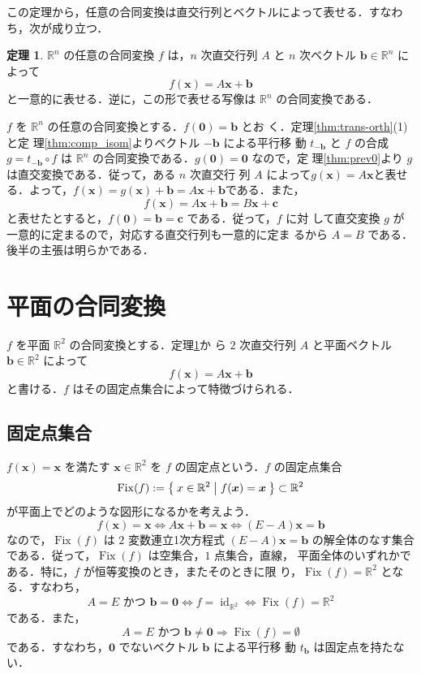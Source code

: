 \documentclass[11pt, uplatex, dvipdfmx, titlepage]{jsarticle}
\makeatletter
\DeclareMathOperator{\Fix}{Fix}
\DeclareMathOperator{\id}{id}
\renewenvironment{proof}[1][\proofname]{\par
  \pushQED{\qed}%
  \normalfont \topsep6\p@\@plus6\p@\relax
  \trivlist
  \item[\hskip\labelsep
         \bfseries
    {#1}]\ignorespaces
}{%
  \popQED\endtrivlist\@endpefalse
}
\theoremstyle{definition}
\newtheorem{theorem}{定理}[section]
\renewcommand{\proofname}{\textbf{証明}}
\makeatother
\begin{document}
この定理から，任意の合同変換は直交行列とベクトルによって表せる．すなわち，次が成り立つ．

\begin{theorem}\label{thm:affine_rep}
  $\mathbb{R}^n$ の任意の合同変換 $f$ は，$n$ 次直交行列 $A$
  と $n$ 次ベクトル $\bm{b} \in \mathbb{R}^n$ によって
  \[
    f(\bm{x}) = A\bm{x} + \bm{b}
  \]
  と一意的に表せる．逆に，この形で表せる写像は $\mathbb{R}^n$ の合同変換である．
\end{theorem}


\begin{proof}
  $f$ を $\mathbb{R}^n$ の任意の合同変換とする．$f(\bm{0})=\bm{b}$ とお
  く．定理\ref{thm:trans-orth}(1)と定
  理\ref{thm:comp_isom}よりベクトル $-\bm{b}$ による平行移
  動 $t_{-\bm{b}}$ と $f$ の合成 $g = t_{-\bm{b}} \circ
  f$ は $\mathbb{R}^n$ の合同変換である．$g(\bm{0})=\bm{0}$ なので，定
  理\ref{thm:prev0}より $g$は直交変換である．従って，ある $n$ 次直交行
  列 $A$
  によって$g(\bm{x})=A\bm{x}$と表せる．よって，$f(\bm{x}) =
  g(\bm{x})+\bm{b} = A\bm{x} + \bm{b}$である．また，
  \[
    f(\bm{x}) = A\bm{x}+\bm{b} = B\bm{x} + \bm{c}
  \]
  と表せたとすると，$f(\bm{0})=\bm{b}=\bm{c}$ である．従って，$f$ に対
  して直交変換 $g$ が一意的に定まるので，対応する直交行列も一意的に定ま
  るから $A=B$ である．後半の主張は明らかである．
\end{proof}


\section{平面の合同変換}\label{sec:2dim}


$f$ を平面 $\mathbb{R}^2$ の合同変換とする．定理\ref{thm:affine_rep}か
ら $2$ 次直交行列 $A$ と平面ベクトル $\bm{b} \in \mathbb{R}^2$ によって
\[
  f(\bm{x}) = A\bm{x} + \bm{b}
\]
と書ける．$f$ はその固定点集合によって特徴づけられる．

\subsection{固定点集合}\label{sec:inv2}

$f(\bm{x})=\bm{x}$ を満たす $\bm{x} \in \mathbb{R}^2$ を $f$ の固定点という．$f$ の固定点集合
\[
  \Fix(f) := \Set{ x \in \mathbb{R}^2 | f(\bm{x}) = \bm{x}} \subset \mathbb{R}^2
\]
が平面上でどのような図形になるかを考えよう．
\[
  f(\bm{x}) = \bm{x} \Leftrightarrow A\bm{x} + \bm{b} = \bm{x} \Leftrightarrow (E-A)\bm{x} = \bm{b}
\]
なので，$\Fix(f)$ は $2$ 変数連立1次方程式 $(E-A)\bm{x} = \bm{b}$
の解全体のなす集合である．従って，$\Fix(f)$ は空集合，$1$ 点集合，直線，
平面全体のいずれかである．特に，$f$ が恒等変換のとき，またそのときに限
り，$\Fix(f)=\mathbb{R}^2$ となる．すなわち，
\[
  A=E \text{ かつ } \bm{b} = \bm{0} \Leftrightarrow f =
  \id_{\mathbb{R}^2} \Leftrightarrow \Fix(f) = \mathbb{R}^2
\]
である．また，
\[
  A=E \text{ かつ } \bm{b} \neq \bm{0} \Rightarrow \Fix(f) = \emptyset
\]
である．すなわち，$\bm{0}$ でないベクトル $\bm{b}$ による平行移
動 $t_{\bm{b}}$ は固定点を持たない．
\end{document}
